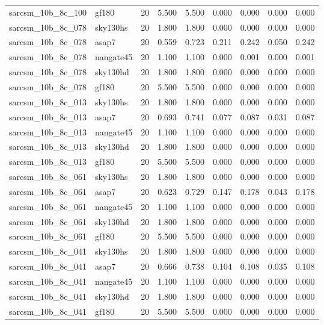 \begin{tabular}{llrrrrrrr}
sarcsm\_10b\_8c\_100 & gf180 & 20 & 5.500 & 5.500 & 0.000 & 0.000 & 0.000 & 0.000 \\
sarcsm\_10b\_8c\_078 & sky130hs & 20 & 1.800 & 1.800 & 0.000 & 0.000 & 0.000 & 0.000 \\
sarcsm\_10b\_8c\_078 & asap7 & 20 & 0.559 & 0.723 & 0.211 & 0.242 & 0.050 & 0.242 \\
sarcsm\_10b\_8c\_078 & nangate45 & 20 & 1.100 & 1.100 & 0.000 & 0.001 & 0.000 & 0.001 \\
sarcsm\_10b\_8c\_078 & sky130hd & 20 & 1.800 & 1.800 & 0.000 & 0.000 & 0.000 & 0.000 \\
sarcsm\_10b\_8c\_078 & gf180 & 20 & 5.500 & 5.500 & 0.000 & 0.000 & 0.000 & 0.000 \\
sarcsm\_10b\_8c\_013 & sky130hs & 20 & 1.800 & 1.800 & 0.000 & 0.000 & 0.000 & 0.000 \\
sarcsm\_10b\_8c\_013 & asap7 & 20 & 0.693 & 0.741 & 0.077 & 0.087 & 0.031 & 0.087 \\
sarcsm\_10b\_8c\_013 & nangate45 & 20 & 1.100 & 1.100 & 0.000 & 0.000 & 0.000 & 0.000 \\
sarcsm\_10b\_8c\_013 & sky130hd & 20 & 1.800 & 1.800 & 0.000 & 0.000 & 0.000 & 0.000 \\
sarcsm\_10b\_8c\_013 & gf180 & 20 & 5.500 & 5.500 & 0.000 & 0.000 & 0.000 & 0.000 \\
sarcsm\_10b\_8c\_061 & sky130hs & 20 & 1.800 & 1.800 & 0.000 & 0.000 & 0.000 & 0.000 \\
sarcsm\_10b\_8c\_061 & asap7 & 20 & 0.623 & 0.729 & 0.147 & 0.178 & 0.043 & 0.178 \\
sarcsm\_10b\_8c\_061 & nangate45 & 20 & 1.100 & 1.100 & 0.000 & 0.000 & 0.000 & 0.000 \\
sarcsm\_10b\_8c\_061 & sky130hd & 20 & 1.800 & 1.800 & 0.000 & 0.000 & 0.000 & 0.000 \\
sarcsm\_10b\_8c\_061 & gf180 & 20 & 5.500 & 5.500 & 0.000 & 0.000 & 0.000 & 0.000 \\
sarcsm\_10b\_8c\_041 & sky130hs & 20 & 1.800 & 1.800 & 0.000 & 0.000 & 0.000 & 0.000 \\
sarcsm\_10b\_8c\_041 & asap7 & 20 & 0.666 & 0.738 & 0.104 & 0.108 & 0.035 & 0.108 \\
sarcsm\_10b\_8c\_041 & nangate45 & 20 & 1.100 & 1.100 & 0.000 & 0.000 & 0.000 & 0.000 \\
sarcsm\_10b\_8c\_041 & sky130hd & 20 & 1.800 & 1.800 & 0.000 & 0.000 & 0.000 & 0.000 \\
sarcsm\_10b\_8c\_041 & gf180 & 20 & 5.500 & 5.500 & 0.000 & 0.000 & 0.000 & 0.000 \\

\end{tabular}
